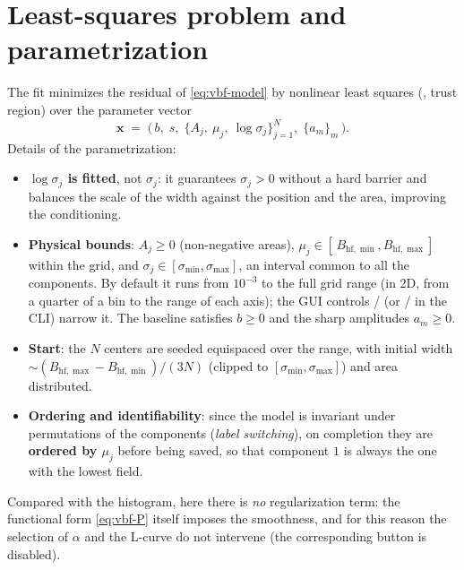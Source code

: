\section{Least-squares problem and parametrization}
\label{sec:vbf-lsq}

The fit minimizes the residual of \eqref{eq:vbf-model} by nonlinear least squares
(, trust region) over the parameter vector
\begin{equation}
  \bm x \;=\; \bigl(\,b,\; s,\; \{A_j,\ \mu_j,\ \log\sigma_j\}_{j=1}^{N},\;
  \{a_m\}_m\,\bigr).
  \label{eq:vbf-x}
\end{equation}
Details of the parametrization:
\begin{itemize}[nosep]
  \item \textbf{$\log\sigma_j$ is fitted}, not $\sigma_j$: it guarantees
        $\sigma_j>0$ without a hard barrier and balances the scale of the width
        against the position and the area, improving the conditioning.
  \item \textbf{Physical bounds}: $A_j\ge0$ (non-negative areas),
        $\mu_j\in[\,B_{\mathrm{hf},\min},B_{\mathrm{hf},\max}]$ within the grid, and
        $\sigma_j\in[\sigma_{\min},\sigma_{\max}]$, an interval common to all the
        components. By default it runs from $10^{-3}$ to the full grid range (in
        2D, from a quarter of a bin to the range of each axis); the GUI controls
        / (or
        / in the CLI) narrow it.
        The baseline satisfies $b\ge0$ and the sharp amplitudes $a_m\ge0$.
  \item \textbf{Start}: the $N$ centers are seeded equispaced over the range,
        with initial width $\sim(B_{\mathrm{hf},\max}-B_{\mathrm{hf},\min})/(3N)$
        (clipped to $[\sigma_{\min},\sigma_{\max}]$) and area distributed.
  \item \textbf{Ordering and identifiability}: since the model is invariant under
        permutations of the components (\emph{label switching}), on completion they
        are \textbf{ordered by $\mu_j$} before being saved, so that component $1$
        is always the one with the lowest field.
\end{itemize}

Compared with the histogram, here there is \emph{no} regularization term: the
functional form \eqref{eq:vbf-P} itself imposes the smoothness, and for this reason
the selection of $\alpha$ and the L-curve do not intervene (the corresponding
button is disabled).

